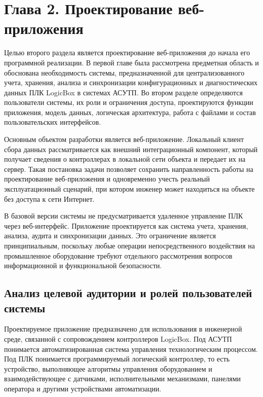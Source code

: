 
\section*{Глава 2. Проектирование веб-приложения}
\label{sec:chapter2}

\providecommand{\tabref}[1]{\hyperref[#1]{таблице~\ref*{#1}}}
\providecommand{\figref}[1]{\hyperref[#1]{рисунке~\ref*{#1}}}
\providecommand{\appref}[1]{\hyperref[#1]{приложении~\ref*{#1}}}

Целью второго раздела является проектирование веб-приложения до начала его программной реализации. В первой главе была рассмотрена предметная область и обоснована необходимость системы, предназначенной для централизованного учета, хранения, анализа и синхронизации конфигурационных и диагностических данных ПЛК LogicBox в системах АСУТП. Во втором разделе определяются пользователи системы, их роли и ограничения доступа, проектируются функции приложения, модель данных, логическая архитектура, работа с файлами и состав пользовательских интерфейсов.

Основным объектом разработки является веб-приложение. Локальный клиент сбора данных рассматривается как внешний интеграционный компонент, который получает сведения о контроллерах в локальной сети объекта и передает их на сервер. Такая постановка задачи позволяет сохранить направленность работы на проектирование веб-приложения и одновременно учесть реальный эксплуатационный сценарий, при котором инженер может находиться на объекте без доступа к сети Интернет.

В базовой версии системы не предусматривается удаленное управление ПЛК через веб-интерфейс. Приложение проектируется как система учета, хранения, анализа, аудита и синхронизации данных. Это ограничение является принципиальным, поскольку любые операции непосредственного воздействия на промышленное оборудование требуют отдельного рассмотрения вопросов информационной и функциональной безопасности.

\subsection{Анализ целевой аудитории и ролей пользователей системы}

Проектируемое приложение предназначено для использования в инженерной среде, связанной с сопровождением контроллеров LogicBox. Под АСУТП понимается автоматизированная система управления технологическим процессом. Под ПЛК понимается программируемый логический контроллер, то есть устройство, выполняющее алгоритмы управления оборудованием и взаимодействующее с датчиками, исполнительными механизмами, панелями оператора и другими устройствами автоматизации.


